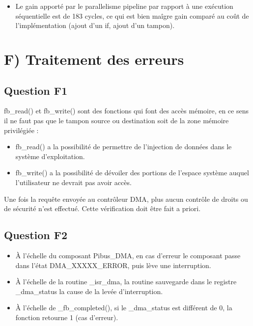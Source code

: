 \documentclass[10pt]{article}
\begin{document}
\begin{itemize}
  \item Le gain apporté par le parallelisme pipeline par rapport à une
  exécution séquentielle est de 183 cycles, ce qui est bien maîgre gain
  comparé au coût de l'implémentation (ajout d'un if, ajout d'un tampon).
\end{itemize}

\section{F) Traitement des erreurs}

\subsection{Question F1}
fb\_read() et fb\_write() sont des fonctions qui font des accès mémoire, en ce
sens il ne faut pas que le tampon source ou destination soit de la zone mémoire
privilégiée :
\begin{itemize}
  \item fb\_read() a la possibilité de permettre de l'injection de données dans
  le système d'exploitation.
  \item fb\_write() a la possibilité de dévoiler des portions de l'espace
  système auquel l'utilisateur ne devrait pas avoir accès.
\end{itemize}

Une fois la requête envoyée au contrôleur DMA, plus aucun contrôle de droits ou
de sécurité n'est effectué. Cette vérification doit être fait a priori.

\subsection{Question F2}
\begin{itemize}
  \item À l'échelle du composant Pibus\_DMA, en cas d'erreur le composant passe
  dans l'état DMA\_XXXXX\_ERROR, puis lève une interruption.
  \item À l'échelle de la routine \_isr\_dma, la routine sauvegarde dans le
  registre \_dma\_status la cause de la levée d'interruption.
  \item À l'échelle de \_fb\_completed(), si le \_dma\_status est différent de
  0, la fonction retourne 1 (cas d'erreur).
\end{itemize}
\end{document}

